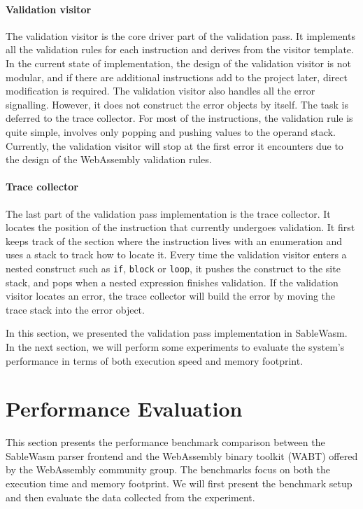 \paragraph{Validation visitor}
The validation visitor is the core driver part of the validation pass. It
implements all the validation rules for each instruction and derives from the
visitor template. In the current state of implementation, the design of the
validation visitor is not modular, and if there are additional instructions add
to the project later, direct modification is required. The validation visitor
also handles all the error signalling. However, it does not construct the error
objects by itself. The task is deferred to the trace collector. For most of the
instructions, the validation rule is quite simple, involves only popping and
pushing values to the operand stack. Currently, the validation visitor will stop
at the first error it encounters due to the design of the WebAssembly validation
rules.

\paragraph{Trace collector}
The last part of the validation pass implementation is the trace collector. It
locates the position of the instruction that currently undergoes validation. It
first keeps track of the section where the instruction lives with an enumeration
and uses a stack to track how to locate it. Every time the validation visitor
enters a nested construct such as \texttt{if}, \texttt{block} or \texttt{loop},
it pushes the construct to the site stack, and pops when a nested expression
finishes validation. If the validation visitor locates an error, the trace
collector will build the error by moving the trace stack into the error object.

In this section, we presented the validation pass implementation in SableWasm.
In the next section, we will perform some experiments to evaluate the system's
performance in terms of both execution speed and memory footprint.

\section{Performance Evaluation}

This section presents the performance benchmark comparison between the SableWasm
parser frontend and the WebAssembly binary toolkit (WABT) offered by the
WebAssembly community group. The benchmarks focus on both the execution time and
memory footprint. We will first present the benchmark setup and then evaluate
the data collected from the experiment.

